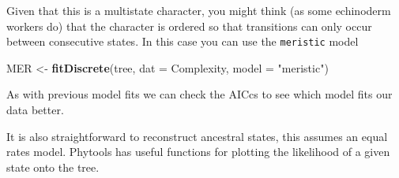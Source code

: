 \documentclass[]{article}
\newenvironment{Shaded}{\begin{snugshade}}{\end{snugshade}}
\newcommand{\KeywordTok}[1]{\textcolor[rgb]{0.13,0.29,0.53}{\textbf{#1}}}
\newcommand{\DataTypeTok}[1]{\textcolor[rgb]{0.13,0.29,0.53}{#1}}
\newcommand{\DecValTok}[1]{\textcolor[rgb]{0.00,0.00,0.81}{#1}}
\newcommand{\FloatTok}[1]{\textcolor[rgb]{0.00,0.00,0.81}{#1}}
\newcommand{\StringTok}[1]{\textcolor[rgb]{0.31,0.60,0.02}{#1}}
\newcommand{\OtherTok}[1]{\textcolor[rgb]{0.56,0.35,0.01}{#1}}
\newcommand{\OperatorTok}[1]{\textcolor[rgb]{0.81,0.36,0.00}{\textbf{#1}}}
\newcommand{\NormalTok}[1]{#1}
\begin{document}
Given that this is a multistate character, you might think (as some
echinoderm workers do) that the character is ordered so that transitions
can only occur between consecutive states. In this case you can use the
\texttt{meristic} model

\begin{Shaded}
\begin{Highlighting}[]
\NormalTok{MER <-}\StringTok{ }\KeywordTok{fitDiscrete}\NormalTok{(tree, }\DataTypeTok{dat =}\NormalTok{ Complexity, }\DataTypeTok{model =} \StringTok{"meristic"}\NormalTok{)}
\end{Highlighting}
\end{Shaded}

As with previous model fits we can check the AICcs to see which model
fits our data better.

\begin{Shaded}
\end{Shaded}

It is also straightforward to reconstruct ancestral states, this assumes
an equal rates model. Phytools has useful functions for plotting the
likelihood of a given state onto the tree.

\begin{Shaded}
\end{Shaded}
\end{document}
